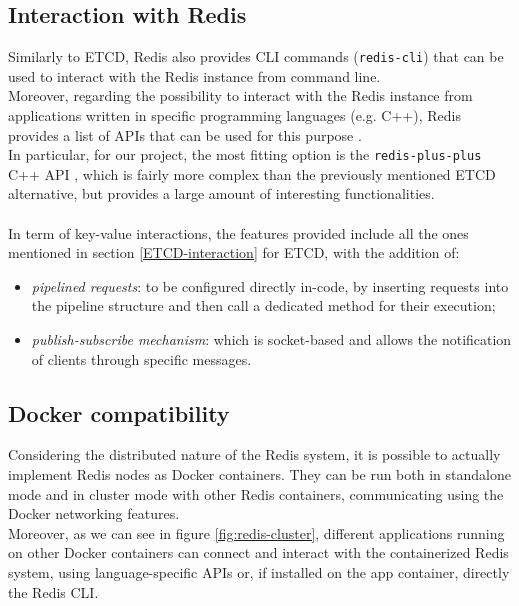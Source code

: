 \subsection{Interaction with Redis}
Similarly to ETCD, Redis also provides CLI commands (\texttt{redis-cli}) that can be used to interact with the Redis instance from command line. \\
Moreover, regarding the possibility to interact with the Redis instance from applications written in specific programming languages (e.g. C++), Redis provides a list of APIs that can be used for this purpose \cite{site:redis-clients}. \\
In particular, for our project, the most fitting option is the \texttt{redis-plus-plus} C++ API \cite{site:redis-plus-plus}, which is fairly more complex than the previously mentioned ETCD alternative, but provides a large amount of interesting functionalities. \\ \\
In term of key-value interactions, the features provided include all the ones mentioned in section \ref{ETCD-interaction} for ETCD, with the addition of:
\begin{itemize}
	\item \textit{pipelined requests}: to be configured directly in-code, by inserting requests into the pipeline structure and then call a dedicated method for their execution;
	\item \textit{publish-subscribe mechanism}: which is socket-based and allows the notification of clients through specific messages.
\end{itemize}

\subsection{Docker compatibility}
Considering the distributed nature of the Redis system, it is possible to actually implement Redis nodes as Docker containers. They can be run both in standalone mode and in cluster mode \cite{site:redis-docker-guide} with other Redis containers, communicating using the Docker networking features. \\
Moreover, as we can see in figure \ref{fig:redis-cluster}, different applications running on other Docker containers can connect and interact with the containerized Redis system, using language-specific APIs or, if installed on the app container, directly the Redis CLI.



